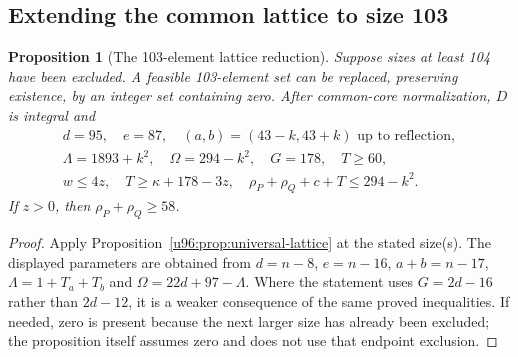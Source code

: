\documentclass[11pt,a4paper]{article}
\newtheorem{proposition}[theorem]{Proposition}
\theoremstyle{remark}
\begin{document}
\subsection{Extending the common lattice to size 103}


\begin{proposition}[The 103-element lattice reduction]\label{u96:prop:103-lattice}
Suppose sizes at least 104 have been excluded. A feasible 103-element set
can be replaced, preserving existence, by an integer set containing zero.
After common-core normalization, $D$ is integral and
\[
 \begin{gathered}
 d=95,\quad e=87,\quad(a,b)=(43-k,43+k)\text{ up to reflection},\\
 \Lambda=1893+k^2,\quad\Omega=294-k^2,\quad G=178,\quad T\geq60,\\
 w\leq4z,\quad T\geq\kappa+178-3z,\quad
 \rho_P+\rho_Q+c+T\leq294-k^2.
 \end{gathered}
\]
If $z>0$, then $\rho_P+\rho_Q\geq58$.
\end{proposition}
\begin{proof}
Apply Proposition~\ref{u96:prop:universal-lattice} at the stated size(s).
The displayed parameters are obtained from $d=n-8$, $e=n-16$,
$a+b=n-17$, $\Lambda=1+T_a+T_b$ and $\Omega=22d+97-\Lambda$.
Where the statement uses $G=2d-16$ rather than $2d-12$, it is a weaker
consequence of the same proved inequalities. If needed, zero is present
because the next larger size has already been excluded; the proposition
itself assumes zero and does not use that endpoint exclusion.
\end{proof}
\end{document}
